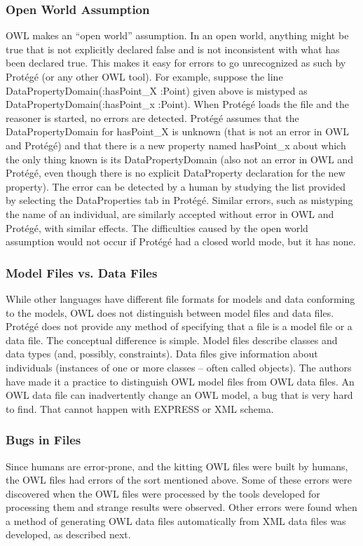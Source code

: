 \subsubsection{Open World Assumption}
OWL makes an ``open world'' assumption.  In an open world, anything might
be true that is not explicitly declared false and is not inconsistent with
what has been declared true. This makes it easy for errors to go
unrecognized as such by  Prot\'{e}g\'{e} (or any other OWL tool). For example,
suppose the line \sf DataPropertyDomain(:hasPoint\_X :Point) \rm given
above is mistyped as \sf DataPropertyDomain(:hasPoint\_x :Point)\rm. When
 Prot\'{e}g\'{e} loads the file and the reasoner is started, no errors are
detected.  Prot\'{e}g\'{e} assumes that the DataPropertyDomain for \sf hasPoint\_X
\rm is unknown (that is not an error in OWL and  Prot\'{e}g\'{e}) and that there is a new
property named \sf hasPoint\_x \rm about which the only thing known is its
DataPropertyDomain (also not an error in OWL and  Prot\'{e}g\'{e}, even though there is no
explicit DataProperty declaration for the new property). The error can be
detected by a human by studying the list provided by selecting the
DataProperties tab in  Prot\'{e}g\'{e}. Similar errors, such as mistyping the name of an individual, are
similarly accepted without error in OWL and  Prot\'{e}g\'{e}, with similar effects.
The difficulties caused by the open world assumption would not occur if
 Prot\'{e}g\'{e} had a closed world mode, but it has none.\\

\subsubsection{Model Files vs. Data Files}
While other languages have different file formats for models and
data conforming to the models, OWL does not distinguish between model files
and data files.  Prot\'{e}g\'{e} does not provide any method of specifying that a
file is a model file or a data file. The conceptual difference is simple. 
Model files describe classes and data types (and, possibly,
constraints). Data files give information about individuals (instances of
one or more classes -- often called objects). The authors have made it a
practice to distinguish OWL model files from OWL data files. An OWL data
file can inadvertently change an OWL model, a bug that is very hard to
find. That cannot happen with EXPRESS or XML schema.\\

\subsubsection{Bugs in Files}
Since humans are error-prone, and the kitting OWL files were built by
humans, the OWL files had errors of the sort mentioned above. Some of these
errors were discovered when the OWL files were processed by the tools
developed for processing them and strange results were observed. Other
errors were found when a method of generating OWL data files automatically
from XML data files was developed, as described next.

